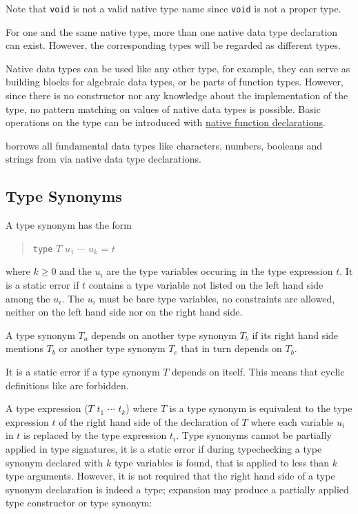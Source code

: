 Note that \texttt{void} is not a valid native type name since \texttt{void} is not a proper type.

For one and the same native type, more than one native data type declaration can exist. However, the corresponding \frege{} types will be regarded as different types.

Native data types can be used like any other type, for example, they can serve as building blocks for algebraic data types, or be parts of function types. However, since there is no constructor nor any knowledge about the implementation of the type, no pattern matching on values of native data types is possible. Basic operations on the type can be introduced with \hyperref[nativefun]{native function declarations}.

\frege{} borrows all fundamental data types like characters, numbers, booleans and strings from \java{} via native data type declarations. 


\subsection{Type Synonyms} \label{typedcl} 

\begin{flushleft}
    \sym{=} 
\end{flushleft}

A type synonym has the form
\begin{quote}
\texttt{type} $T$ $u_1$ $\cdots$ $u_k$ = $t$
\end{quote}
where $k\ge 0$ and the $u_i$ are the type variables occuring in the type expression $t$. It is a static error if $t$ contains a type variable not listed on the left hand side among the $u_i$. The $u_i$ must be bare type variables, no constraints are allowed, neither on the left hand side nor on the right hand side.

A type synonym $T_a$ depends on another type synonym $T_b$ if its right hand side mentions $T_b$ or another type synonym $T_c$ that in turn depends on $T_b$.

It is a static error if a type synonym $T$ depends on itself.
This means that cyclic definitions like 
are forbidden.

A type expression ($T$ $t_1$ $\cdots$ $t_k$) where $T$ is a type synonym is equivalent to the type expression $t$ of the right hand side of the declaration of $T$ where each variable $u_i$ in $t$ is replaced by the type expression $t_i$. Type synonyms cannot be partially applied in type signatures, it is a static error if during typechecking a type synonym declared with $k$ type variables is found, that is applied to less than $k$ type arguments. However, it is not required that the right hand side of a type synonym declaration is indeed a type; expansion may produce a partially applied type constructor or type synonym:

